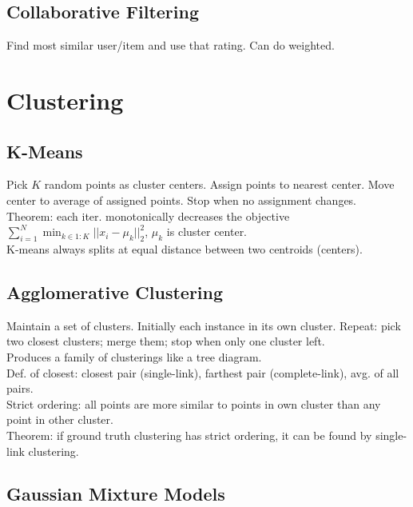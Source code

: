\subsection*{Collaborative Filtering}

Find most similar user/item and use that rating. Can do weighted.

\section{Clustering}

\subsection*{K-Means}

Pick $K$ random points as cluster centers. Assign points to nearest center. Move center to average of assigned points. Stop when no assignment changes.\\
Theorem: each iter. monotonically decreases the objective $\sum_{i=1}^N \min_{k\in1:K}||x_i - \mu_k||_2^2$, $\mu_k$ is cluster center.\\
K-means always splits at equal distance between two centroids (centers).

\subsection*{Agglomerative Clustering}

Maintain a set of clusters. Initially each instance in its own cluster. Repeat: pick two closest clusters; merge them; stop when only one cluster left.\\
Produces a family of clusterings like a tree diagram.\\
Def. of closest: closest pair (single-link), farthest pair (complete-link), avg. of all pairs.\\
Strict ordering: all points are more similar to points in own cluster than any point in other cluster.\\
Theorem: if ground truth clustering has strict ordering, it can be found by single-link clustering.

\subsection*{Gaussian Mixture Models}

